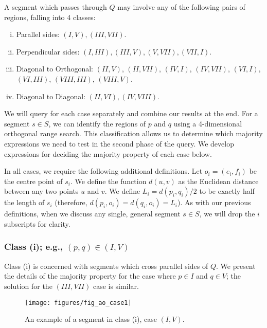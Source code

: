 A segment which passes through $Q$ may involve any of the following pairs of regions, falling into 4 classes:

\begin{enumerate}[i.]
\item Parallel sides: $(I, V), (III, VII)$.
\item Perpendicular sides: $(I, III), (III, V), (V,VII), (VII, I)$.
\item Diagonal to Orthogonal: $(II, V)$, $(II, VII)$, $(IV, I)$, $(IV, VII)$, $(VI, I)$, $(VI, III)$, $(VIII, III)$, $(VIII, V)$.
\item Diagonal to Diagonal: $(II, VI), (IV, VIII)$.
\end{enumerate}

We will query for each case separately and combine our results at the end. For a segment $s \in S$, we can identify the regions of $p$ and $q$ using a 4-dimensional orthogonal range search. This classification allows us to determine which majority expressions we need to test in the second phase of the query. We develop expressions for deciding the majority property of each case below.

In all cases, we require the following additional definitions. Let $o_i = (e_i, f_i)$ be the centre point of $s_i$.  We define the function $d(u,v)$ as the Euclidean distance between any two points $u$ and $v$. We define $L_i = d(p_i, q_i)/2$ to be exactly half the length of $s_i$ (therefore, $d(p_i, o_i) = d(q_i, o_i) = L_i$). As with our previous definitions, when we discuss any single, general segment $s \in S$, we will drop the $i$ subscripts for clarity.


\subsubsection{Class (i); e.g., $(p, q) \in (I, V)$}
\label{:rectangles:ao:class1}

Class (i) is concerned with segments which cross parallel sides of $Q$. We present the details of the majority property for the case where $p \in I$ and $q \in V$; the solution for the $(III, VII)$ case is similar.

\begin{figure}[t]
\begin{center}
  \texttt{[image: figures/fig\_ao\_case1]}
  \caption{An example of a segment in class (i), case $(I, V)$.}
  \label{fig:rectangles:ao:case1}
\end{center}
\end{figure}

